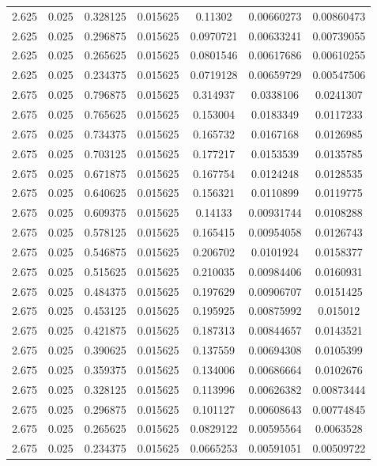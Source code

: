 \begin{flushleft}
\begin{longtable}{ccccccc}
2.625 & 0.025 & 0.328125 & 0.015625 & 0.11302 & 0.00660273 & 0.00860473  \\ 
2.625 & 0.025 & 0.296875 & 0.015625 & 0.0970721 & 0.00633241 & 0.00739055  \\ 
2.625 & 0.025 & 0.265625 & 0.015625 & 0.0801546 & 0.00617686 & 0.00610255  \\ 
2.625 & 0.025 & 0.234375 & 0.015625 & 0.0719128 & 0.00659729 & 0.00547506  \\ 
2.675 & 0.025 & 0.796875 & 0.015625 & 0.314937 & 0.0338106 & 0.0241307  \\ 
2.675 & 0.025 & 0.765625 & 0.015625 & 0.153004 & 0.0183349 & 0.0117233  \\ 
2.675 & 0.025 & 0.734375 & 0.015625 & 0.165732 & 0.0167168 & 0.0126985  \\ 
2.675 & 0.025 & 0.703125 & 0.015625 & 0.177217 & 0.0153539 & 0.0135785  \\ 
2.675 & 0.025 & 0.671875 & 0.015625 & 0.167754 & 0.0124248 & 0.0128535  \\ 
2.675 & 0.025 & 0.640625 & 0.015625 & 0.156321 & 0.0110899 & 0.0119775  \\ 
2.675 & 0.025 & 0.609375 & 0.015625 & 0.14133 & 0.00931744 & 0.0108288  \\ 
2.675 & 0.025 & 0.578125 & 0.015625 & 0.165415 & 0.00954058 & 0.0126743  \\ 
2.675 & 0.025 & 0.546875 & 0.015625 & 0.206702 & 0.0101924 & 0.0158377  \\ 
2.675 & 0.025 & 0.515625 & 0.015625 & 0.210035 & 0.00984406 & 0.0160931  \\ 
2.675 & 0.025 & 0.484375 & 0.015625 & 0.197629 & 0.00906707 & 0.0151425  \\ 
2.675 & 0.025 & 0.453125 & 0.015625 & 0.195925 & 0.00875992 & 0.015012  \\ 
2.675 & 0.025 & 0.421875 & 0.015625 & 0.187313 & 0.00844657 & 0.0143521  \\ 
2.675 & 0.025 & 0.390625 & 0.015625 & 0.137559 & 0.00694308 & 0.0105399  \\ 
2.675 & 0.025 & 0.359375 & 0.015625 & 0.134006 & 0.00686664 & 0.0102676  \\ 
2.675 & 0.025 & 0.328125 & 0.015625 & 0.113996 & 0.00626382 & 0.00873444  \\ 
2.675 & 0.025 & 0.296875 & 0.015625 & 0.101127 & 0.00608643 & 0.00774845  \\ 
2.675 & 0.025 & 0.265625 & 0.015625 & 0.0829122 & 0.00595564 & 0.0063528  \\ 
2.675 & 0.025 & 0.234375 & 0.015625 & 0.0665253 & 0.00591051 & 0.00509722  \\ 

\end{longtable}
\end{flushleft}
